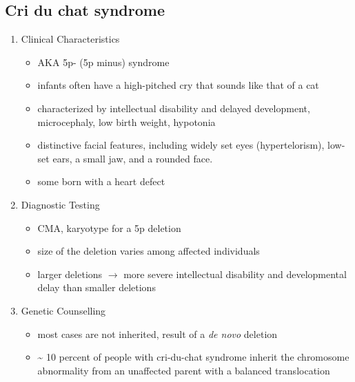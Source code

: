 \documentclass[12pt]{scrartcl}
\begin{document}
\subsection{Cri du chat syndrome}
\label{sec:org89f828d}
\begin{enumerate}
\item Clinical Characteristics
\label{sec:org42745d3}
\begin{itemize}
\item AKA 5p- (5p minus) syndrome
\item infants often have a high-pitched cry that sounds like that of a
cat
\item characterized by intellectual disability and delayed development,
microcephaly, low birth weight, hypotonia
\item distinctive facial features, including widely set eyes
(hypertelorism), low-set ears, a small jaw, and a rounded face.
\item some born with a heart defect
\end{itemize}

\item Diagnostic Testing
\label{sec:orgbda0a4c}
\begin{itemize}
\item CMA, karyotype for a 5p deletion
\item size of the deletion varies among affected individuals
\item larger deletions \(\to\) more severe intellectual disability and
developmental delay than smaller deletions
\end{itemize}

\item Genetic Counselling
\label{sec:org8392aee}
\begin{itemize}
\item most cases are not inherited, result of a \emph{de novo} deletion
\item \textasciitilde{} 10 percent of people with cri-du-chat syndrome inherit the
chromosome abnormality from an unaffected parent with a balanced translocation
\end{itemize}
\end{enumerate}
\end{document}

